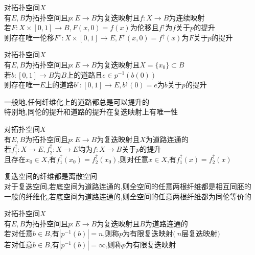 \begin{dingli}
对拓扑空间$X$\\
有$E,B$为拓扑空间且$p:E\to B$为复迭映射且$f:X\to B$为连续映射\\
若$F:X\times[0,1]\to B,F(x,0)=f(x)$为伦移且$f^{\uparrow}$为$f$关于$p$的提升\\
则存在唯一伦移$F^{\uparrow}:X\times[0,1]\to E,F^{\uparrow}(x,0)=f^{\uparrow}(x)$为$F$关于$p$的提升
\end{dingli}

\begin{dingli}
对拓扑空间$X$\\
有$E,B$为拓扑空间且$p:E\to B$为复迭映射且$X=\{x_0\}\subset B$\\
若$b:[0,1]\to B$为$B$上的道路且$e\in p^{-1}(b(0))$\\
则存在唯一$E$上的道路$b^{\uparrow}:[0,1]\to E,b^{\uparrow}(0)=e$为$b$关于$p$的提升
\end{dingli}

\begin{zhu}
一般地,任何纤维化上的道路都总是可以提升的\\
特别地,同伦的提升和道路的提升在复迭映射上有唯一性
\end{zhu}

\begin{dingli}
对拓扑空间$X$\\
有$E,B$为拓扑空间且$p:E\to B$为复迭映射且$X$为道路连通的\\
若$f_1^{\uparrow}:X\to E,f_2^{\uparrow}:X\to E$均为$f:X\to B$关于$p$的提升\\
且存在$x_0\in X$,有$f_1^{\uparrow}(x_0)=f_2^{\uparrow}(x_0)$,则对任意$x\in X$,有$f_1^{\uparrow}(x)=f_2^{\uparrow}(x)$
\end{dingli}

\begin{zhu}
复迭空间的纤维都是离散空间\\
对于复迭空间,若底空间为道路连通的,则全空间的任意两根纤维都是相互同胚的\\
一般的纤维化,若底空间为道路连通的,则全空间的任意两根纤维都为同伦等价的
\end{zhu}

\begin{dingyi}
对拓扑空间$X$\\
有$E,B$为拓扑空间且$p:E\to B$为复迭映射且$B$为道路连通的\\
若对任意$b\in B$,有$|p^{-1}(b)|=n$,则称$p$为有限复迭映射$(\ n$层复迭映射$)$\\
若对任意$b\in B$,有$|p^{-1}(b)|=\infty$,则称$p$为有限复迭映射
\end{dingyi}

